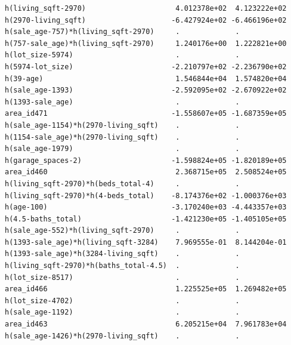 \documentclass[
]{article}
\begin{document}
\begin{verbatim}
h(living_sqft-2970)                     4.012378e+02  4.123222e+02
h(2970-living_sqft)                    -6.427924e+02 -6.466196e+02
h(sale_age-757)*h(living_sqft-2970)     .             .           
h(757-sale_age)*h(living_sqft-2970)     1.240176e+00  1.222821e+00
h(lot_size-5974)                        .             .           
h(5974-lot_size)                       -2.210797e+02 -2.236790e+02
h(39-age)                               1.546844e+04  1.574820e+04
h(sale_age-1393)                       -2.592095e+02 -2.670922e+02
h(1393-sale_age)                        .             .           
area_id471                             -1.558607e+05 -1.687359e+05
h(sale_age-1154)*h(2970-living_sqft)    .             .           
h(1154-sale_age)*h(2970-living_sqft)    .             .           
h(sale_age-1979)                        .             .           
h(garage_spaces-2)                     -1.598824e+05 -1.820189e+05
area_id460                              2.368715e+05  2.508524e+05
h(living_sqft-2970)*h(beds_total-4)     .             .           
h(living_sqft-2970)*h(4-beds_total)    -8.174376e+02 -1.000376e+03
h(age-100)                             -3.170240e+03 -4.443357e+03
h(4.5-baths_total)                     -1.421230e+05 -1.405105e+05
h(sale_age-552)*h(living_sqft-2970)     .             .           
h(1393-sale_age)*h(living_sqft-3284)    7.969555e-01  8.144204e-01
h(1393-sale_age)*h(3284-living_sqft)    .             .           
h(living_sqft-2970)*h(baths_total-4.5)  .             .           
h(lot_size-8517)                        .             .           
area_id466                              1.225525e+05  1.269482e+05
h(lot_size-4702)                        .             .           
h(sale_age-1192)                        .             .           
area_id463                              6.205215e+04  7.961783e+04
h(sale_age-1426)*h(2970-living_sqft)    .             .           
                                                                  

\end{verbatim}
\end{document}
